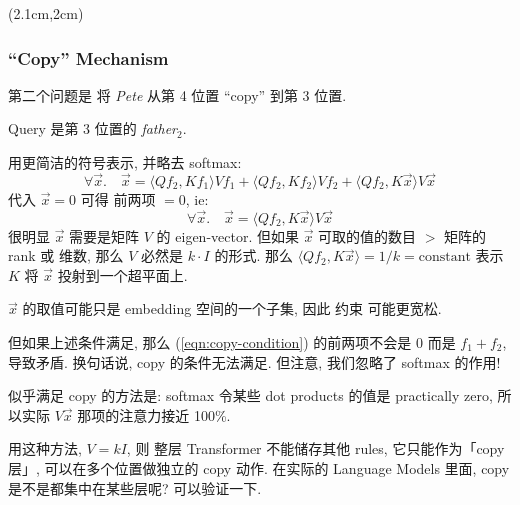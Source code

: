 \begin{preview}
\begin{minipage}{\textwidth}
	
\setlength{\parskip}{0.4\baselineskip}
\begin{textblock*}{20cm}(2.1cm,2cm) %
	{}
	\hspace{8cm}
\end{textblock*}

\vspace*{0.3cm} 

\subsubsection{``Copy'' Mechanism}

第二个问题是 将 \textit{Pete} 从第 4 位置 ``copy'' 到第 3 位置.

Query 是第 3 位置的 \textit{father}$_2$.

用更简洁的符号表示, 并略去 softmax:
\begin{equation}
\forall \vec{x}. \quad \vec{x} = \langle Q f_2, K f_1 \rangle V f_1 + \langle Q f_2, K f_2 \rangle V f_2 + \langle Q f_2, K \vec{x} \rangle V \vec{x}
\label{eqn:copy-condition}
\end{equation}
代入 $\vec{x} = 0$ 可得 前两项 $= 0$, ie:
\begin{equation}
\forall \vec{x}. \quad \vec{x} = \langle Q f_2, K \vec{x} \rangle V \vec{x}
\end{equation}
很明显 $\vec{x}$ 需要是矩阵 $V$ 的 eigen-vector.  但如果 $\vec{x}$ 可取的值的数目 $>$ 矩阵的 rank 或 维数, 那么 $V$ 必然是 $k \cdot I$ 的形式.  那么 $\langle Q f_2, K \vec{x} \rangle = 1/k = \mbox{constant}$ 表示 $K$ 将 $\vec{x}$ 投射到一个超平面上.

$\vec{x}$ 的取值可能只是 embedding 空间的一个子集, 因此 约束 可能更宽松.

但如果上述条件满足, 那么 (\ref{eqn:copy-condition}) 的前两项不会是 0 而是 $f_1 + f_2$, 导致矛盾.  换句话说, copy 的条件无法满足.  但注意, 我们忽略了 softmax 的作用!

似乎满足 copy 的方法是: softmax 令某些 dot products 的值是 practically zero, 所以实际 $V \vec{x}$ 那项的注意力接近 100\%.

用这种方法, $V = k I$, 则 整层 Transformer 不能储存其他 rules, 它只能作为「copy 层」, 可以在多个位置做独立的 copy 动作.  在实际的 Language Models 里面, copy 是不是都集中在某些层呢?  可以验证一下.


\end{minipage}
\end{preview}
